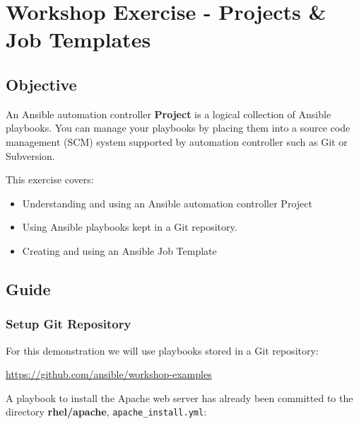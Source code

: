 \hypertarget{workshop-exercise---projects-job-templates}{%
\section{Workshop Exercise - Projects \& Job
Templates}\label{workshop-exercise---projects-job-templates}}

\hypertarget{objective}{%
\subsection{Objective}\label{objective}}

An Ansible automation controller \textbf{Project} is a logical
collection of Ansible playbooks. You can manage your playbooks by
placing them into a source code management (SCM) system supported by
automation controller such as Git or Subversion.

This exercise covers:

\begin{itemize}
\tightlist
\item
  Understanding and using an Ansible automation controller Project
\item
  Using Ansible playbooks kept in a Git repository.
\item
  Creating and using an Ansible Job Template
\end{itemize}

\hypertarget{guide}{%
\subsection{Guide}\label{guide}}

\hypertarget{setup-git-repository}{%
\subsubsection{Setup Git Repository}\label{setup-git-repository}}

For this demonstration we will use playbooks stored in a Git repository:

\url{https://github.com/ansible/workshop-examples}

A playbook to install the Apache web server has already been committed
to the directory \textbf{rhel/apache}, \texttt{apache\_install.yml}:

